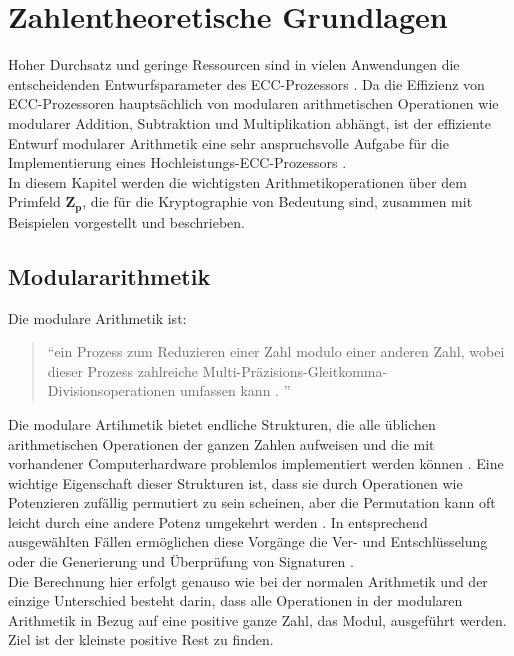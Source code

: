 \chapter{Zahlentheoretische Grundlagen}

Hoher Durchsatz und geringe Ressourcen sind in vielen Anwendungen die entscheidenden Entwurfsparameter des ECC-Prozessors \cite{Hossain2019}.
Da die Effizienz von ECC-Prozessoren hauptsächlich von modularen
arithmetischen Operationen wie modularer Addition, Subtraktion und Multiplikation abhängt, ist der effiziente Entwurf modularer
Arithmetik eine sehr anspruchsvolle Aufgabe für die
Implementierung eines Hochleistungs-ECC-Prozessors \cite{Hossain2019}.\\ 

In diesem Kapitel werden die wichtigsten Arithmetikoperationen  über dem Primfeld $ \mathbf{ Z_p } $, die für die Kryptographie von Bedeutung sind, zusammen mit Beispielen vorgestellt und beschrieben. 

\section{Modulararithmetik}

Die modulare Arithmetik ist:
\begin{quote} \enquote{ein Prozess zum Reduzieren einer Zahl modulo einer
anderen Zahl, wobei dieser Prozess zahlreiche
Multi-Präzisions-Gleitkomma-Divisionsoperationen
umfassen kann \cite{patent}.
}\end{quote} 
Die modulare Artihmetik bietet endliche Strukturen, die alle üblichen arithmetischen Operationen der ganzen Zahlen aufweisen und die mit vorhandener Computerhardware problemlos implementiert werden können \cite{Contini2011}.
Eine wichtige Eigenschaft dieser Strukturen ist, dass sie durch Operationen wie Potenzieren zufällig permutiert zu sein scheinen, aber die Permutation kann oft leicht durch eine andere Potenz umgekehrt werden \cite{Contini2011}.
In entsprechend ausgewählten Fällen ermöglichen diese Vorgänge die Ver- und
Entschlüsselung oder die Generierung und Überprüfung von Signaturen
\cite{Contini2011}.\\

Die Berechnung hier erfolgt genauso wie bei der normalen Arithmetik
und der einzige Unterschied besteht darin, dass  alle
Operationen in der modularen Arithmetik in Bezug auf eine
positive ganze Zahl, das Modul, ausgeführt werden.
Ziel ist der kleinste positive Rest zu finden. \\

